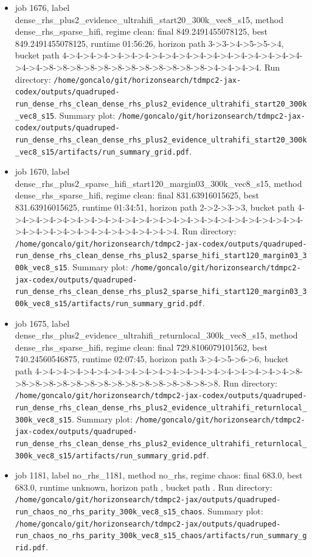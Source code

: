 \begin{itemize}
\item job 1676, label dense\_rhs\_plus2\_evidence\_ultrahifi\_start20\_300k\_vec8\_s15, method dense\_rhs\_sparse\_hifi, regime clean: final 849.2491455078125, best 849.2491455078125, runtime 01:56:26, horizon path 3->3->4->5->5->4, bucket path 4->4->4->4->4->4->4->4->4->4->4->4->4->4->4->4->4->4->4->4->8->8->8->8->8->8->8->8->8->8->8->8->4->4->4->4. Run directory: \texttt{/home/goncalo/git/horizonsearch/tdmpc2-jax-codex/outputs/quadruped-run\_dense\_rhs\_clean\_dense\_rhs\_plus2\_evidence\_ultrahifi\_start20\_300k\_vec8\_s15}. Summary plot: \texttt{/home/goncalo/git/horizonsearch/tdmpc2-jax-codex/outputs/quadruped-run\_dense\_rhs\_clean\_dense\_rhs\_plus2\_evidence\_ultrahifi\_start20\_300k\_vec8\_s15/artifacts/run\_summary\_grid.pdf}.
\item job 1670, label dense\_rhs\_plus2\_sparse\_hifi\_start120\_margin03\_300k\_vec8\_s15, method dense\_rhs\_sparse\_hifi, regime clean: final 831.63916015625, best 831.63916015625, runtime 01:34:51, horizon path 2->2->3->3, bucket path 4->4->4->4->4->4->4->4->4->4->4->4->4->4->4->4->4->4->4->4->4->4->4->4->4->4->4->4->4->4->4->4->4->4. Run directory: \texttt{/home/goncalo/git/horizonsearch/tdmpc2-jax-codex/outputs/quadruped-run\_dense\_rhs\_clean\_dense\_rhs\_plus2\_sparse\_hifi\_start120\_margin03\_300k\_vec8\_s15}. Summary plot: \texttt{/home/goncalo/git/horizonsearch/tdmpc2-jax-codex/outputs/quadruped-run\_dense\_rhs\_clean\_dense\_rhs\_plus2\_sparse\_hifi\_start120\_margin03\_300k\_vec8\_s15/artifacts/run\_summary\_grid.pdf}.
\item job 1675, label dense\_rhs\_plus2\_evidence\_ultrahifi\_returnlocal\_300k\_vec8\_s15, method dense\_rhs\_sparse\_hifi, regime clean: final 729.8106079101562, best 740.24560546875, runtime 02:07:45, horizon path 3->4->5->6->6, bucket path 4->4->4->4->4->4->4->4->4->4->4->4->4->4->4->4->4->4->4->8->8->8->8->8->8->8->8->8->8->8->8->8->8->8->8. Run directory: \texttt{/home/goncalo/git/horizonsearch/tdmpc2-jax-codex/outputs/quadruped-run\_dense\_rhs\_clean\_dense\_rhs\_plus2\_evidence\_ultrahifi\_returnlocal\_300k\_vec8\_s15}. Summary plot: \texttt{/home/goncalo/git/horizonsearch/tdmpc2-jax-codex/outputs/quadruped-run\_dense\_rhs\_clean\_dense\_rhs\_plus2\_evidence\_ultrahifi\_returnlocal\_300k\_vec8\_s15/artifacts/run\_summary\_grid.pdf}.
\item job 1181, label no\_rhs\_1181, method no\_rhs, regime chaos: final 683.0, best 683.0, runtime unknown, horizon path , bucket path . Run directory: \texttt{/home/goncalo/git/horizonsearch/tdmpc2-jax/outputs/quadruped-run\_chaos\_no\_rhs\_parity\_300k\_vec8\_s15\_chaos}. Summary plot: \texttt{/home/goncalo/git/horizonsearch/tdmpc2-jax/outputs/quadruped-run\_chaos\_no\_rhs\_parity\_300k\_vec8\_s15\_chaos/artifacts/run\_summary\_grid.pdf}.

\end{itemize}
